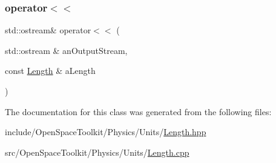 \mbox{\label{classostk_1_1physics_1_1units_1_1_length_a95a13170a8d57cb0060eae94520eace4}} 
\subsubsection{\texorpdfstring{operator$<$$<$}{operator<<}}
{\footnotesize\ttfamily std\+::ostream\& operator$<$$<$ (\begin{DoxyParamCaption}\item[{std\+::ostream \&}]{an\+Output\+Stream,  }\item[{const \hyperlink{classostk_1_1physics_1_1units_1_1_length}{Length} \&}]{a\+Length }\end{DoxyParamCaption})\hspace{0.3cm}{\ttfamily [friend]}}



The documentation for this class was generated from the following files\+:\begin{DoxyCompactItemize}
\item 
include/\+Open\+Space\+Toolkit/\+Physics/\+Units/\hyperlink{_length_8hpp}{Length.\+hpp}\item 
src/\+Open\+Space\+Toolkit/\+Physics/\+Units/\hyperlink{_length_8cpp}{Length.\+cpp}\end{DoxyCompactItemize}
